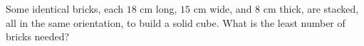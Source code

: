 Some identical bricks, each $18$ cm long, $15$ cm wide, and $8$ cm thick, are stacked, all in the same orientation, to build a solid cube. What is the least number of bricks needed?
